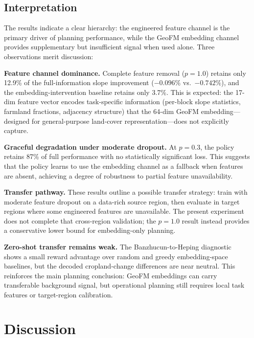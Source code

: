 \documentclass{article}
\begin{document}
\subsection{Interpretation}

The results indicate a clear hierarchy: the engineered feature channel is the primary driver of planning performance, while the GeoFM embedding channel provides supplementary but insufficient signal when used alone. Three observations merit discussion:

\textbf{Feature channel dominance.} Complete feature removal ($p=1.0$) retains only 12.9\% of the full-information slope improvement ($-0.096\%$ vs.\ $-0.742\%$), and the embedding-intervention baseline retains only 3.7\%. This is expected: the 17-dim feature vector encodes task-specific information (per-block slope statistics, farmland fractions, adjacency structure) that the 64-dim GeoFM embedding---designed for general-purpose land-cover representation---does not explicitly capture.

\textbf{Graceful degradation under moderate dropout.} At $p=0.3$, the policy retains 87\% of full performance with no statistically significant loss. This suggests that the policy learns to use the embedding channel as a fallback when features are absent, achieving a degree of robustness to partial feature unavailability.

\textbf{Transfer pathway.} These results outline a possible transfer strategy: train with moderate feature dropout on a data-rich source region, then evaluate in target regions where some engineered features are unavailable. The present experiment does not complete that cross-region validation; the $p=1.0$ result instead provides a conservative lower bound for embedding-only planning.

\textbf{Zero-shot transfer remains weak.} The Banzhucun-to-Heping diagnostic shows a small reward advantage over random and greedy embedding-space baselines, but the decoded cropland-change differences are near neutral. This reinforces the main planning conclusion: GeoFM embeddings can carry transferable background signal, but operational planning still requires local task features or target-region calibration.



\section{Discussion}
\label{sec:discussion}
\end{document}
